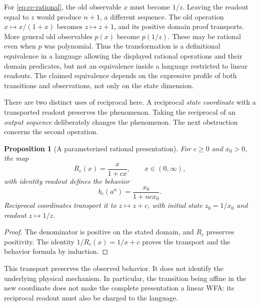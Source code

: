 \documentclass[11pt]{article}
\newtheorem{proposition}[theorem]{Proposition}
\theoremstyle{definition}
\begin{document}
For \eqref{eq:cc-rational}, the old observable $x$ must become $1/z$.
Leaving the readout equal to $z$ would produce $n+1$, a different sequence.
The old operation $x\mapsto x/(1+x)$ becomes $z\mapsto z+1$, and its positive
domain proof transports. More general old observables $p(x)$ become
$p(1/z)$. These may be rational even when $p$ was polynomial. Thus the
transformation is a definitional equivalence in a language allowing the
displayed rational operations and their domain predicates, but not an
equivalence inside a language restricted to linear readouts. The claimed
equivalence depends on the expressive profile of both transitions and
observations, not only on the state dimension.

There are two distinct uses of reciprocal here. A reciprocal \emph{state
coordinate} with a transported readout preserves the phenomenon. Taking
the reciprocal of an \emph{output sequence} deliberately changes the
phenomenon. The next obstruction concerns the second operation.

\begin{proposition}[A parameterized rational presentation]
\label{lr:rational-family}
For $c\geq0$ and $x_0>0$, the map
\[
 R_c(x)=\frac{x}{1+cx},\qquad x\in(0,\infty),
\]
with identity readout defines the behavior
\[
 b_c(a^n)=\frac{x_0}{1+ncx_0}.
\]
Reciprocal coordinates transport it to $z\mapsto z+c$, with initial state
$z_0=1/x_0$ and readout $z\mapsto1/z$.
\end{proposition}
\begin{proof}
The denominator is positive on the stated domain, and $R_c$ preserves
positivity. The identity $1/R_c(x)=1/x+c$ proves the transport and the
behavior formula by induction.
\end{proof}

This transport preserves the observed behavior. It does not identify the
underlying physical mechanism. In particular, the transition being affine
in the new coordinate does not make the complete presentation a linear WFA:
its reciprocal readout must also be charged to the language.
\end{document}
